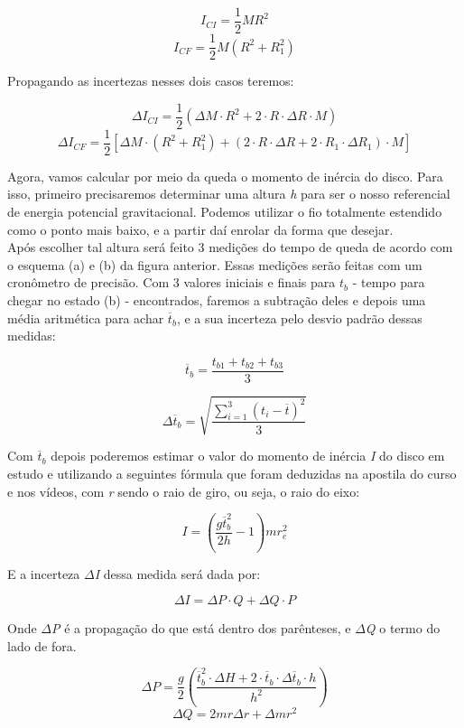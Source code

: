 \[I_{CI} = \frac{1}{2}MR^2\]
\[I_{CF} = \frac{1}{2}M(R^2 + R_1^2)\]

Propagando as incertezas nesses dois casos teremos:

\[\Delta I_{CI} = \frac{1}{2} \left( \Delta M \cdot R^2 + 2 \cdot R \cdot \Delta R \cdot M \right)\]
\[\Delta I_{CF} = \frac{1}{2} 
    \left[ 
        \Delta M \cdot (R^2 + R_1^2) + 
        \left( 2 \cdot R \cdot \Delta R + 2 \cdot R_1 \cdot \Delta R_1 \right) \cdot M
    \right]
\]

Agora, vamos calcular por meio da queda o momento de inércia do disco. Para isso, primeiro precisaremos determinar uma altura \textit{h} para ser o nosso referencial de energia potencial gravitacional. Podemos utilizar o fio totalmente estendido como o ponto mais baixo, e a partir daí enrolar da forma que desejar.\\

Após escolher tal altura será feito 3 medições do tempo de queda de acordo com o esquema (a) e (b) da figura anterior. Essas medições serão feitas com um cronômetro de precisão. Com 3 valores iniciais e finais para \textit{$t_b$} - tempo para chegar no estado (b) - encontrados, faremos a subtração deles e depois uma média aritmética para achar $\overline{t}_b$, e a sua incerteza pelo desvio padrão dessas medidas:

\[\overline{t}_b = \frac{t_{b1} + t_{b2} + t_{b3}}{3}\]

\[\Delta \overline{t}_b = \sqrt{\frac{\sum_{i=1}^{3} (t_i - \overline{t})^2}{3}}\]

Com $\overline{t}_b$ depois poderemos estimar o valor do momento de inércia \textit{I} do disco em estudo e utilizando a seguintes fórmula que foram deduzidas na apostila do curso e nos vídeos, com \textit{r} sendo o raio de giro, ou seja, o raio do eixo:

\[I = \left( \frac{g \overline{t}_b^2}{2h} - 1 \right) mr_e^2\]

E a incerteza \textit{$\Delta$I} dessa medida será dada por:

\[\Delta I = \Delta P \cdot Q + \Delta Q \cdot P\]

Onde \textit{$\Delta$P} é a propagação do que está dentro dos parênteses, e \textit{$\Delta$Q} o termo do lado de fora.

\[
    \Delta P = \frac{g}{2} 
    \left( 
        \frac
        {\overline{t}_b^2 \cdot \Delta H + 2 \cdot \overline{t}_b \cdot \Delta \overline{t}_b \cdot h}
        {h^2} 
    \right)
\]
\[\Delta Q = 2mr \Delta r + \Delta m r^2\]
